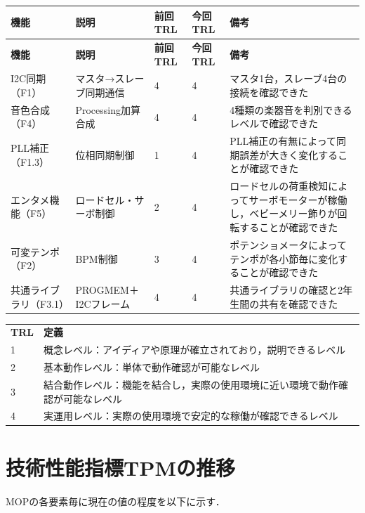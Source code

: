 \documentclass[a4paper,12pt]{ltjsarticle}
\begin{document}
\begin{longtable}{L{2.5cm}L{4cm}C{2cm}C{2cm}L{3.5cm}}
  \toprule
  \textbf{機能} & \textbf{説明} & \textbf{前回TRL} & \textbf{今回TRL} & \textbf{備考} \\
  \midrule
  \endfirsthead
  \toprule
  \textbf{機能} & \textbf{説明} & \textbf{前回TRL} & \textbf{今回TRL} & \textbf{備考} \\
  \midrule
  \endhead
  \midrule
  \endfoot
  \bottomrule
  \endlastfoot
  I2C同期（F1） & マスタ→スレーブ同期通信 & 4 & 4 & マスタ1台，スレーブ4台の接続を確認できた \\
  音色合成（F4） & Processing加算合成 & 4 & 4 & 4種類の楽器音を判別できるレベルで確認できた \\
  PLL補正（F1.3） & 位相同期制御 & 1 & 4 & PLL補正の有無によって同期誤差が大きく変化することが確認できた \\
  エンタメ機能（F5） & ロードセル・サーボ制御 & 2 & 4 & ロードセルの荷重検知によってサーボモーターが稼働し，ベビーメリー飾りが回転することが確認できた \\
  可変テンポ（F2） & BPM制御 & 3 & 4 & ポテンショメータによってテンポが各小節毎に変化することが確認できた \\
  共通ライブラリ（F3.1） & PROGMEM＋I2Cフレーム & 4 & 4 & 共通ライブラリの確認と2年生間の共有を確認できた \\
\end{longtable}

\noindent
{\small
\begin{tabular}{ll}
  \textbf{TRL} & \textbf{定義} \\
  1 & 概念レベル：アイディアや原理が確立されており，説明できるレベル \\
  2 & 基本動作レベル：単体で動作確認が可能なレベル \\
  3 & 結合動作レベル：機能を結合し，実際の使用環境に近い環境で動作確認が可能なレベル \\
  4 & 実運用レベル：実際の使用環境で安定的な稼働が確認できるレベル \\
\end{tabular}
}

\section{技術性能指標TPMの推移} 
MOPの各要素毎に現在の値の程度を以下に示す．
\end{document}
